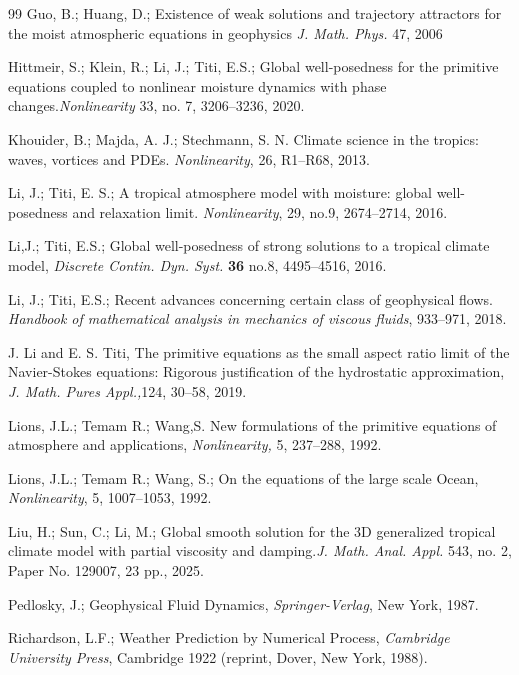 \documentclass[11pt, a4paper, article,reqno,]{amsart}
\theoremstyle{remark}
\numberwithin{equation}{section}
\begin{document}
\begin{thebibliography}{99}
 Guo, B.; Huang, D.;  Existence of weak solutions and trajectory attractors for the moist atmospheric
equations in geophysics \textit{J. Math. Phys.} 47, 2006



Hittmeir, S.; Klein, R.; Li, J.; Titi, E.S.; Global well-posedness for the primitive equations coupled to nonlinear moisture dynamics with phase changes.\textit{Nonlinearity} 33, no. 7, 3206--3236, 2020.


Khouider, B.; Majda, A. J.; Stechmann, S. N. Climate science in the tropics: waves, vortices and PDEs. \textit{Nonlinearity}, 26, R1--R68, 2013.





 Li, J.; Titi, E. S.; A tropical atmosphere model with moisture: global well-posedness and relaxation limit. \textit{Nonlinearity}, 29,
no.9, 2674--2714, 2016.

Li,J.; Titi, E.S.; Global well-posedness of strong solutions to a tropical climate model, \textit{Discrete Contin. Dyn. Syst.} {\bf 36}  no.8, 
4495--4516, 2016.

Li, J.; Titi, E.S.; 
Recent advances concerning certain class of geophysical flows. \textit{Handbook of mathematical analysis in mechanics of viscous fluids}, 933--971, 2018.

 J. Li and E. S. Titi, The primitive equations as the small aspect ratio limit of the Navier-Stokes equations: Rigorous justification of the hydrostatic approximation, \textit{J. Math. Pures Appl.,}124,  30--58, 2019.


Lions, J.L.; Temam R.; Wang,S.  New formulations of the primitive equations of atmosphere and applications, \textit{Nonlinearity,} 5, 237--288, 1992.

Lions, J.L.; Temam R.; Wang, S.; On the equations of the large scale Ocean, \textit{Nonlinearity}, 5, 1007--1053, 1992.

Liu, H.; Sun, C.; Li, M.; Global smooth solution for the 3D generalized tropical climate model with partial viscosity and damping.\textit{J. Math. Anal. Appl.} 543, no. 2, Paper No. 129007, 23 pp., 2025.

Pedlosky, J.; Geophysical Fluid Dynamics, \textit{Springer-Verlag}, New York, 1987.


Richardson, L.F.; Weather Prediction by Numerical Process, \textit{Cambridge University Press}, Cambridge 1922 (reprint, Dover, New York, 1988).



\end{thebibliography}
\end{document}
